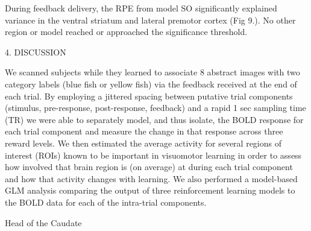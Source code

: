 During feedback delivery, the RPE from model SO significantly explained variance in the ventral striatum and lateral premotor cortex (Fig 9.).  No other region or model reached or approached the significance threshold.



 

                                              4. DISCUSSION



We scanned subjects while they learned to associate 8 abstract images with two category labels (blue fish or yellow fish) via the feedback received at the end of each trial.  By employing a jittered spacing between putative trial components (stimulus, pre-response, post-response, feedback) and a rapid 1 sec sampling time (TR) we were able to separately model, and thus isolate, the BOLD response for each trial component and measure the change in that response across three reward levels.   We then estimated the average activity for several regions of interest (ROIs) known to be important in visuomotor learning in order to assess how involved that brain region is (on average) at during each trial component and how that activity changes with learning.  We also performed a model-based GLM analysis comparing the output of three reinforcement learning models to the BOLD data for each of the intra-trial components.



Head of the Caudate

